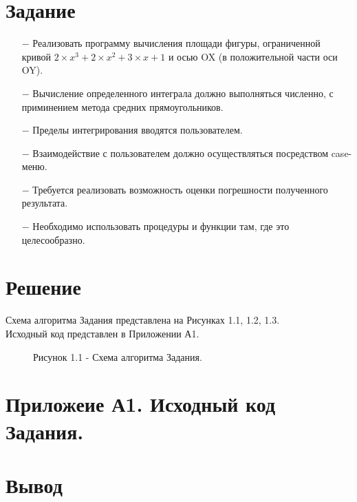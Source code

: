 \documentclass[oneside,a4paper,14pt]{extarticle}
\begin{document}
\section*{Задание}
\begin{itemize}
    \item[$-$] Реализовать программу вычисления площади фигуры, ограниченной кривой $2 \times x^3 + 2 \times x^2 + 3 \times x + 1$ и осью OX (в положительной части оси OY).
    \item[$-$] Вычисление определенного интеграла должно выполняться численно, с приминением метода средних прямоугольников.
    \item[$-$] Пределы интегрирования вводятся пользователем.
    \item[$-$] Взаимодействие с пользователем должно осуществляться посредством case-меню.
    \item[$-$] Требуется реализовать возможность оценки погрешности полученного результата.
    \item[$-$] Необходимо использовать процедуры и функции там, где это целесообразно.

\end{itemize}

\section*{Решение}
\noindent Схема алгоритма Задания представлена на Рисунках 1.1, 1.2, 1.3.\\
\noindent Исходный код представлен в Приложении А1.\\
\newpage
\begin{figure}[!ht]
	\centering
	\caption*{Рисунок 1.1 - Схема алгоритма Задания.}
\end{figure}

\section*{Приложеие А1. Исходный код Задания.}
\section*{Вывод}
\end{document}
